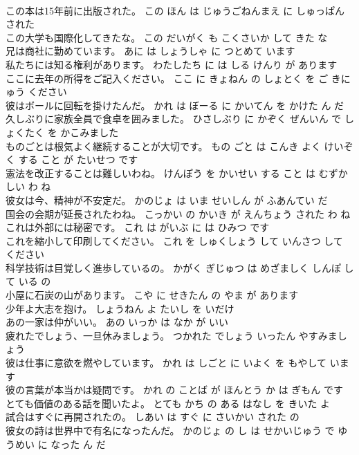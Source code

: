 \documentclass[8pt]{extreport}
\begin{document}
\begin{CJK}{UTF8}{min}
\\	この本は15年前に出版された。	この ほん は じゅうごねんまえ に しゅっぱん された 
\\	この大学も国際化してきたな。	この だいがく も こくさいか して きた な 
\\	兄は商社に勤めています。	あに は しょうしゃ に つとめて います 
\\	私たちには知る権利があります。	わたしたち に は しる けんり が あります 
\\	ここに去年の所得をご記入ください。	ここ に きょねん の しょとく を ご きにゅう ください 
\\	彼はボールに回転を掛けたんだ。	かれ は ぼーる に かいてん を かけた ん だ 
\\	久しぶりに家族全員で食卓を囲みました。	ひさしぶり に かぞく ぜんいん で しょくたく を かこみました 
\\	ものごとは根気よく継続することが大切です。	もの ごと は こんき よく けいぞく する こと が たいせつ です 
\\	憲法を改正することは難しいわね。	けんぽう を かいせい する こと は むずかしい わ ね 
\\	彼女は今、精神が不安定だ。	かのじょ は いま せいしん が ふあんてい だ 
\\	国会の会期が延長されたわね。	こっかい の かいき が えんちょう された わ ね 
\\	これは外部には秘密です。	これ は がいぶ に は ひみつ です 
\\	これを縮小して印刷してください。	これ を しゅくしょう して いんさつ して ください 
\\	科学技術は目覚しく進歩しているの。	かがく ぎじゅつ は めざましく しんぽ して いる の 
\\	小屋に石炭の山があります。	こや に せきたん の やま が あります 
\\	少年よ大志を抱け。	しょうねん よ たいし を いだけ 
\\	あの一家は仲がいい。	あの いっか は なか が いい 
\\	疲れたでしょう、一旦休みましょう。	つかれた でしょう いったん やすみましょう 
\\	彼は仕事に意欲を燃やしています。	かれ は しごと に いよく を もやして います 
\\	彼の言葉が本当かは疑問です。	かれ の ことば が ほんとう か は ぎもん です 
\\	とても価値のある話を聞いたよ。	とても かち の ある はなし を きいた よ 
\\	試合はすぐに再開されたの。	しあい は すぐ に さいかい された の 
\\	彼女の詩は世界中で有名になったんだ。	かのじょ の し は せかいじゅう で ゆうめい に なった ん だ 

\end{CJK}
\end{document}
